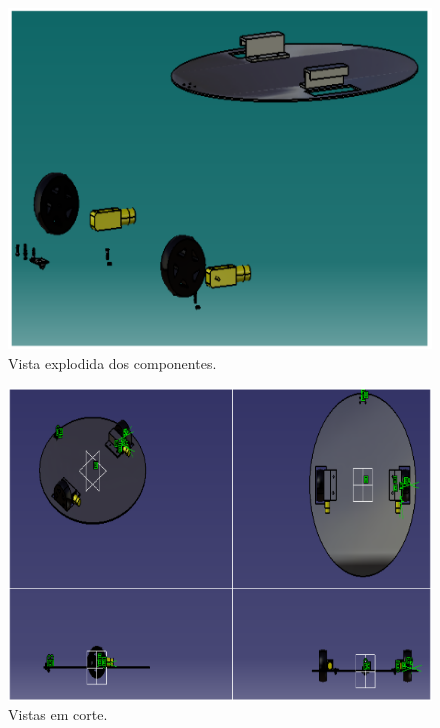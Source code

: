 \begin{figure}[H]
	\centering
	\includegraphics[scale=0.3]{figuras/vista_explodida.png}
	\caption{Vista explodida dos componentes.}
	\label{img:vista_explodida}
\end{figure}

\begin{figure}[H]
	\centering
	\includegraphics[scale=0.3]{figuras/vistas_em_corte.png}
	\caption{Vistas em corte.}
	\label{img:vistas_em_corte}
\end{figure}
